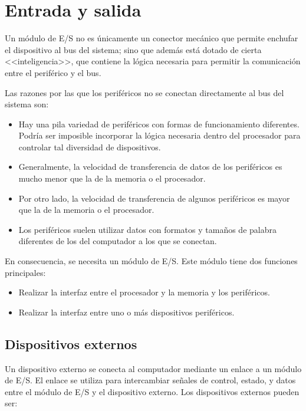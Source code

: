 \section{Entrada y salida}

Un módulo de E/S no es únicamente un conector mecánico que permite enchufar el dispositivo al bus del sistema; sino que además está dotado de cierta <<inteligencia>>, que contiene la lógica necesaria para permitir la comunicación entre el periférico y el bus.

Las razones por las que los periféricos no se conectan directamente al bus del sistema son:

\begin{itemize}
  \item Hay una pila variedad de periféricos con formas de funcionamiento diferentes. Podría ser imposible incorporar la lógica necesaria dentro del procesador para controlar tal diversidad de dispositivos.
  \item Generalmente, la velocidad de transferencia de datos de los periféricos es mucho menor que la de la memoria o el procesador.
  \item Por otro lado, la velocidad de transferencia de algunos periféricos es mayor que la de la memoria o el procesador.
  \item Los periféricos suelen utilizar datos con formatos y tamaños de palabra diferentes de los del computador a los que se conectan.
\end{itemize}

En consecuencia, se necesita un módulo de E/S. Este módulo tiene dos funciones principales:

\begin{itemize}
  \item Realizar la interfaz entre el procesador y la memoria y los periféricos.
  \item Realizar la interfaz entre uno o más dispositivos periféricos.
\end{itemize}

\subsection{Dispositivos externos}

Un dispositivo externo se conecta al computador mediante un enlace a un módulo de E/S. El enlace se utiliza para intercambiar señales de control, estado, y datos entre el módulo de E/S y el dispositivo externo. Los dispositivos externos pueden ser:

